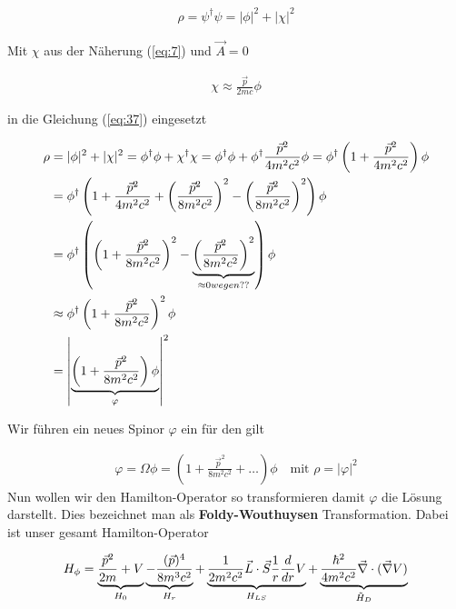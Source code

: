 \begin{align}
  \label{eq:37}
  \rho = \psi^\dagger\psi = |\phi|^2+|\chi|^2
\end{align}

Mit \(\chi\) aus der Näherung (\ref{eq:7}) und \(\vec A=0\)

\begin{align}
  \label{eq:38}
   \chi \approx \frac{\vec p}{2mc}\phi
\end{align}

in die Gleichung (\ref{eq:37}) eingesetzt

\begin{align}
  \label{eq:39}
  \rho &= |\phi|^2+|\chi|^2  = \phi^\dagger\phi + \chi^\dagger\chi =  \phi^\dagger\phi + \phi^\dagger \frac{\vec p^2}{4m^2c^2}\phi = \phi^\dagger\left(1 + \frac{\vec p^2}{4m^2c^2} \right) \phi\notag\\
&= \phi^\dagger\left(1 + \frac{\vec p^2}{4m^2c^2} + \left(\frac{\vec p^2}{8m^2c^2}\right)^2 -\left(\frac{\vec p^2}{8m^2c^2}\right)^2   \right) \phi\notag\\
&= \phi^\dagger\left( \left(1 + \frac{\vec p^2}{8m^2c^2}\right)^2 -\underbr{\left(\frac{\vec p^2}{8m^2c^2}\right)^2}_{\approx 0 wegen ??}   \right) \phi\notag\\
&\approx \phi^\dagger \left(1 + \frac{\vec p^2}{8m^2c^2}\right)^2 \phi\notag\\
&= \left| \underbr{\left(1 + \frac{\vec p^2}{8m^2c^2}\right) \phi}_{\varphi} \right|^2
\end{align}


Wir führen ein neues Spinor \(\varphi\) ein für den gilt

\begin{align}
  \label{eq:40}
  \varphi = \Omega\phi = \left(1 + \frac{\vec p^2}{8m^2c^2} + \dots \right) \phi \quad\text{mit }\rho = |\varphi|^2
\end{align}
Nun wollen wir den Hamilton-Operator so transformieren damit \(\varphi\) die Lösung darstellt. Dies bezeichnet man als \textbf{Foldy-Wouthuysen} Transformation. Dabei ist unser gesamt Hamilton-Operator

\begin{align}
  \label{eq:42}
  H_\phi = \underbr{\frac{\vec p^2}{2m}  +V}_{H_0}\underbr{ - \frac{(\vec p)^4 }{8m^3c^2}}_{H_r}+\underbr{ \frac{1 }{2m^2c^2}\vec L\cdot\vec S \frac{1}{r}\frac{d}{dr}V}_{H_{LS}} + \underbr{\frac{\hbar^2 }{4m^2c^2}\vec \nabla\cdot(\vec\nabla V)}_{\tilde H_D}
\end{align}

